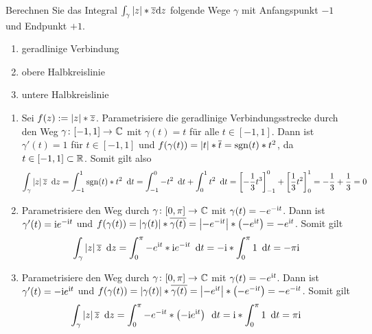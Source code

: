\begin{exercisePage}
	
	\begin{task}
		Berechnen Sie das Integral $\int_\gamma \left| z \right| * \overline{z} \mathrm{d}{z}$ folgende Wege $\gamma$ mit Anfangspunkt $-1$ und Endpunkt $+1$.
		\begin{enumerate}[nolistsep]
			\item geradlinige Verbindung
			\item obere Halbkreislinie
			\item untere Halbkreislinie
		\end{enumerate}
	\end{task}

	\begin{enumerate}[label=(zu \alph*), leftmargin=*]
		\item Sei $f(z) \mathrel{:=} \left| z \right| * \overline{z}$. Parametrisiere die geradlinige Verbindungsstrecke durch den Weg $\abb{\gamma}{[-1,1]}{\CC}$ mit $\gamma(t) = t$ für alle $t \in [-1,1]$. Dann ist $\gamma'(t) = 1$ für $t \in [-1,1]$ und $f(\gamma(t))  = \left| t \right| * \overline{t} = \operatorname{sgn}(t) * t^2$, da $t \in [-1,1] \subset \mathbb{R}$. Somit gilt also
		\begin{equation*}
			\int_\gamma \left| z \right| \overline{z} \enskip \mathrm{d}z 
			= \int_{-1}^1 \operatorname{sgn}(t) * t^2 \enskip \mathrm{d}t 
			= \int_{-1}^0 -t^2 \enskip \mathrm{d}t + \int_0^1 t^2 \enskip \mathrm{d}t 
			= \left[ -\frac{1}{3}t^3 \right]_{-1}^0 + \left[ \frac{1}{3}t^2 \right]_0^1 
			= - \frac{1}{3} + \frac{1}{3} = 0
		\end{equation*}
		
		\item Parametrisiere den Weg durch $\abb{\gamma}{[0, \pi]}{\CC}$ mit $\gamma(t) = -e^{-\mathrm{i} t}$. Dann ist $\gamma'(t) = \mathrm{i} e^{-\mathrm{i} t}$ und $f(\gamma(t)) = \left| \gamma(t) \right| * \overline{\gamma(t)} = \left| - e^{- \mathrm{i} t} \right| * \left( -e ^{\mathrm{i} t} \right) = - e^{\mathrm{i} t}$. Somit gilt
		\begin{equation*}
			\int_\gamma \left| z \right| \overline{z} \enskip \mathrm{d}z 
			= \int_0^\pi  - e^{\mathrm{i} t} * \mathrm{i} e^{-\mathrm{i} t} \enskip \mathrm{d}t 
			= -\mathrm{i} * \int_0^\pi 1 \enskip \mathrm{d}t
			= - \pi \mathrm{i}
		\end{equation*}
		
		\item Parametrisiere den Weg durch $\abb{\gamma}{[0, \pi]}{\CC}$ mit $\gamma(t) = -e^{\mathrm{i} t}$. Dann ist $\gamma'(t) = -\mathrm{i} e^{\mathrm{i} t}$ und $f(\gamma(t)) = \left| \gamma(t) \right| * \overline{\gamma(t)} = \left| - e^{\mathrm{i} t} \right| * \left( -e ^{-\mathrm{i} t} \right) = - e^{-\mathrm{i} t}$. Somit gilt
		\begin{equation*}
			\int_\gamma \left| z \right| \overline{z} \enskip \mathrm{d}z 
			= \int_0^\pi   - e^{-\mathrm{i} t} * \left( -\mathrm{i} e^{\mathrm{i} t} \right) \enskip \mathrm{d}t 
			= \mathrm{i} * \int_0^\pi 1 \enskip \mathrm{d}t
			= \pi \mathrm{i}
		\end{equation*}
	\end{enumerate}


\end{exercisePage}
